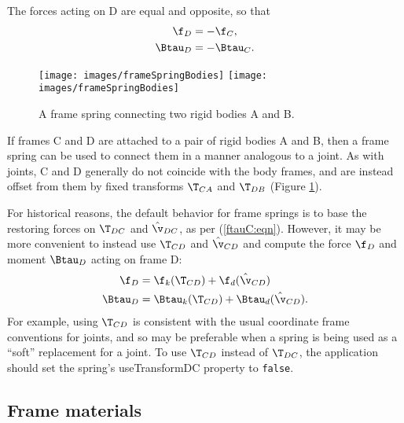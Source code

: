 The forces acting on D are equal and opposite, so that
%
\begin{align}
\f_D & = - \f_C, \notag \\
\Btau_D & = - \Btau_C.
\label{ftau2:eqn}
\end{align}
%

\begin{figure}[ht]
\begin{center}
 \iflatexml
   \texttt{[image: images/frameSpringBodies]}
 \else
   \texttt{[image: images/frameSpringBodies]}
 \fi
\end{center}
\caption{A frame spring connecting two rigid bodies A and B.}
\label{frameSpringBodies:fig}
\end{figure}

If frames C and D are attached to a pair of rigid bodies A and B, then
a frame spring can be used to connect them in a manner analogous to a
joint. As with joints, C and D generally do not coincide with the body
frames, and are instead offset from them by fixed transforms $\T_{CA}$
and $\T_{DB}$ (Figure \ref{frameSpringBodies:fig}).

\begin{sideblock}

For historical reasons, the default behavior for frame springs is to base the
restoring forces on $\T_{DC}$ and $\hat\v_{DC}$, as per (\ref{ftauC:eqn}).
However, it may be more convenient to instead use $\T_{CD}$ and $\hat\v_{CD}$
and compute the force $\f_D$ and moment $\Btau_D$ acting on frame D:
%
\begin{align}
\f_D & = \f_{k} (\T_{CD}) + \f_{d} (\hat\v_{CD}) \notag \\
\Btau_D & = \Btau_{k} (\T_{CD}) + \Btau_{d} (\hat\v_{CD}).
\label{ftauD:eqn}
\end{align}
%
For example, using $\T_{CD}$ is consistent with the usual coordinate frame
conventions for joints, and so may be preferable when a spring is being used as
a ``soft'' replacement for a joint.  To use $\T_{CD}$ instead of $\T_{DC}$, the
application should set the spring's {\sf useTransformDC} property to {\tt false}.
\end{sideblock}

\subsection{Frame materials}

